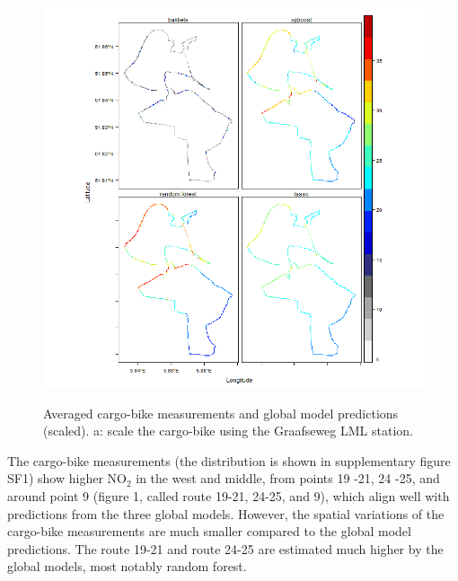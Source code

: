 \documentclass{article}
\begin{document}
\begin{figure}[H]
    \includegraphics[width=\linewidth]{f4.png}
    \label{seperate}
    \caption {Averaged cargo-bike measurements and global model predictions (scaled). a: scale the cargo-bike using the Graafseweg LML station.}
\end{figure}
The cargo-bike measurements (the distribution is shown in supplementary figure SF1) show higher NO$_2$ in the west and middle, from points 19 -21, 24 -25, and around point 9 (figure 1, called route 19-21, 24-25, and 9), which align well with predictions from the three global models. However, the spatial variations of the cargo-bike measurements are much smaller compared to the global model predictions. The route 19-21 and route 24-25 are estimated much higher by the global models, most notably random forest.    
 
\end{document}
